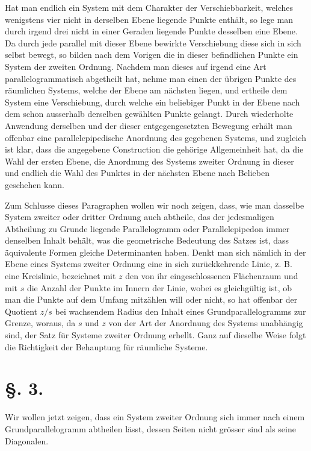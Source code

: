 \documentclass[11pt]{article}
\begin{document}
Hat man endlich ein System mit dem Charakter der Verschiebbarkeit, welches wenigstens vier nicht in derselben Ebene liegende Punkte enthält, so lege man durch irgend drei nicht in einer Geraden liegende Punkte desselben eine Ebene. Da durch jede parallel mit dieser Ebene bewirkte Verschiebung diese sich in sich selbst bewegt, so bilden nach dem Vorigen die in dieser befindlichen Punkte ein System der zweiten Ordnung. Nachdem man dieses auf irgend eine Art parallelogrammatisch abgetheilt hat, nehme man einen der übrigen Punkte des räumlichen Systems, welche der Ebene am nächsten liegen, und ertheile dem System eine Verschiebung, durch welche ein beliebiger Punkt in der Ebene nach dem schon ausserhalb derselben gewählten Punkte gelangt. Durch wiederholte Anwendung derselben und der dieser entgegengesetzten Bewegung erhält man offenbar eine parallelepipedische Anordnung des gegebenen Systems, und zugleich ist klar, dass die angegebene Construction die gehörige Allgemeinheit hat, da die Wahl der ersten Ebene, die Anordnung des Systems zweiter Ordnung in dieser und endlich die Wahl des Punktes in der nächsten Ebene nach Belieben geschehen kann.

Zum Schlusse dieses Paragraphen wollen wir noch zeigen, dass, wie man dasselbe System zweiter oder dritter Ordnung auch abtheile, das der jedesmaligen Abtheilung zu Grunde liegende Parallelogramm oder Parallelepipedon immer denselben Inhalt behält, was die geometrische Bedeutung des Satzes ist, dass äquivalente Formen gleiche Determinanten haben. Denkt man sich nämlich in der Ebene eines Systems zweiter Ordnung eine in sich zurückkehrende Linie, z. B. eine Kreislinie, bezeichnet mit $z$ den von ihr eingeschlossenen Flächenraum und mit $s$ die Anzahl der Punkte im Innern der Linie, wobei es gleichgültig ist, ob man die Punkte auf dem Umfang mitzählen will oder nicht, so hat offenbar der Quotient $z/s$ bei wachsendem Radius den Inhalt eines Grundparallelogramms zur Grenze, woraus, da $s$ und $z$ von der Art der Anordnung des Systems unabhängig sind, der Satz für Systeme zweiter Ordnung erhellt. Ganz auf dieselbe Weise folgt die Richtigkeit der Behauptung für räumliche Systeme.

\section*{§. 3.}

Wir wollen jetzt zeigen, dass ein System zweiter Ordnung sich immer nach einem Grundparallelogramm abtheilen lässt, dessen Seiten nicht grösser sind als seine Diagonalen.
\end{document}
